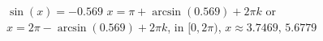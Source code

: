  {$\sin(x) = -0.569$}
{ $x = \pi + \arcsin(0.569) + 2\pi k$ or $x = 2\pi - \arcsin(0.569) + 2\pi k$, in  $[0, 2\pi)$, $x \approx 3.7469, \, 5.6779$}
